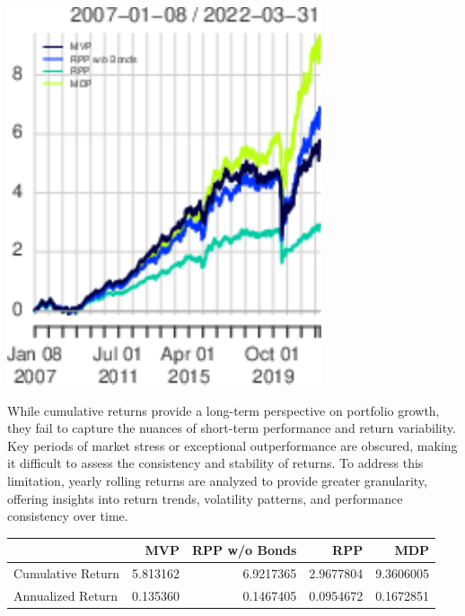 \documentclass[11pt,preprint]{elsarticle}
\let\origfigure\figure
\let\endorigfigure\endfigure
\renewenvironment{figure}[1][2] {
    \expandafter\origfigure\expandafter[H]
} {
    \endorigfigure
}
\let\origtable\table
\let\endorigtable\endtable
\renewenvironment{table}[1][2] {
    \expandafter\origtable\expandafter[H]
} {
    \endorigtable
}
\numberwithin{equation}{section}
\numberwithin{figure}{section}
\numberwithin{table}{section}
\begin{document}
\begin{figure}[H]

{\centering \includegraphics{Essay_files/figure-latex/Figure1-1} 

}

\caption{Cumulative returns over the whole portfolio runtime \label{Figure1}}\label{fig:Figure1}
\end{figure}

While cumulative returns provide a long-term perspective on portfolio
growth, they fail to capture the nuances of short-term performance and
return variability. Key periods of market stress or exceptional
outperformance are obscured, making it difficult to assess the
consistency and stability of returns. To address this limitation, yearly
rolling returns are analyzed to provide greater granularity, offering
insights into return trends, volatility patterns, and performance
consistency over time.

\begin{table}
\centering
\caption{\label{tab:returns}Cumulative and Annualized Returns}
\centering
\begin{tabular}[t]{l|r|r|r|r}
\hline
  & MVP & RPP w/o Bonds & RPP & MDP\\
\hline
Cumulative Return & 5.813162 & 6.9217365 & 2.9677804 & 9.3606005\\
\hline
Annualized Return & 0.135360 & 0.1467405 & 0.0954672 & 0.1672851\\
\hline
\end{tabular}
\end{table}
\end{document}
